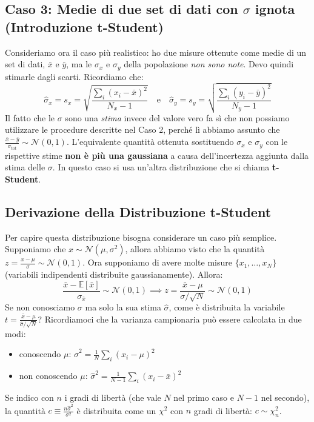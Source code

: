 \documentclass[openany,a4paper,12pt]{book}
\theoremstyle{remark}
\begin{document}
\subsection*{Caso 3: Medie di due set di dati con $\sigma$ ignota (Introduzione t-Student)}
Consideriamo ora il caso più realistico: ho due misure ottenute come medie di un set di dati, $\bar{x}$ e $\bar{y}$, ma le $\sigma_x$ e $\sigma_y$ della popolazione \textit{non sono note}. Devo quindi stimarle dagli scarti. Ricordiamo che:
$$ \hat{\sigma}_x = s_x = \sqrt{\frac{\sum_{i} (x_i - \bar{x})^2}{N_x - 1}} \quad \text{e} \quad \hat{\sigma}_y = s_y = \sqrt{\frac{\sum_{i} (y_i - \bar{y})^2}{N_y - 1}} $$
Il fatto che le $\sigma$ sono una \textit{stima} invece del valore vero fa sì che non possiamo utilizzare le procedure descritte nel Caso 2, perché lì abbiamo assunto che $\frac{\bar{x}-\bar{y}}{\sigma_{\text{tot}}} \sim \mathcal{N}(0,1)$.
L'equivalente quantità ottenuta sostituendo $\sigma_x$ e $\sigma_y$ con le rispettive stime \textbf{non è più una gaussiana} a causa dell'incertezza aggiunta dalla stima delle $\sigma$.
In questo caso si usa un'altra distribuzione che si chiama \textbf{t-Student}.

\subsection{Derivazione della Distribuzione t-Student}
Per capire questa distribuzione bisogna considerare un caso più semplice. Supponiamo che $x \sim \mathcal{N}(\mu, \sigma^2)$, allora abbiamo visto che la quantità $z = \frac{x-\mu}{\sigma} \sim \mathcal{N}(0,1)$.
Ora supponiamo di avere molte misure $\{x_1, \dots, x_N\}$ (variabili indipendenti distribuite gaussianamente). Allora:
$$ \frac{\bar{x} - \mathbb{E}[\bar{x}]}{\sigma_{\bar{x}}} \sim \mathcal{N}(0,1) \implies z = \frac{\bar{x}-\mu}{\sigma/\sqrt{N}} \sim \mathcal{N}(0,1) $$
Se non conosciamo $\sigma$ ma solo la sua stima $\hat{\sigma}$, come è distribuita la variabile $t = \frac{\bar{x}-\mu}{\hat{\sigma}/\sqrt{N}}$?
Ricordiamoci che la varianza campionaria può essere calcolata in due modi:
\begin{itemize}
    \item conoscendo $\mu$: $\hat{\sigma}^2 = \frac{1}{N} \sum_{i} (x_i - \mu)^2$
    \item non conoscendo $\mu$: $\hat{\sigma}^2 = \frac{1}{N-1} \sum_{i} (x_i - \bar{x})^2$
\end{itemize}
Se indico con $n$ i gradi di libertà (che vale $N$ nel primo caso e $N-1$ nel secondo), la quantità $c \equiv \frac{n \hat{\sigma}^2}{\sigma^2}$ è distribuita come un $\chi^2$ con $n$ gradi di libertà: $c \sim \chi^2_n$. 
\end{document}
